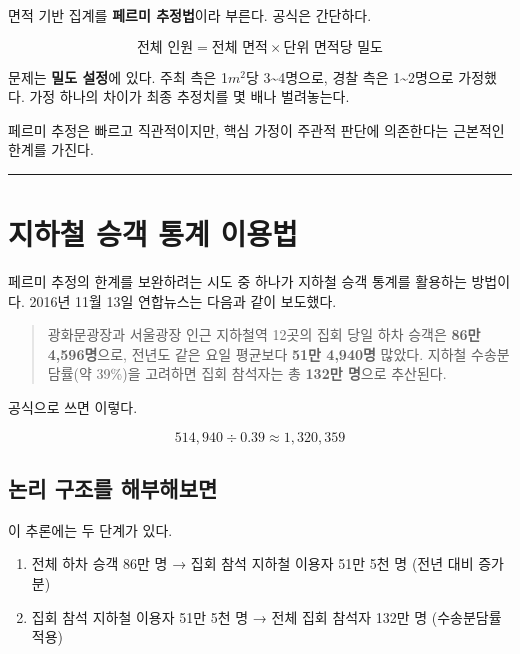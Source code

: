 \documentclass[
  letterpaper,
  DIV=11,
  numbers=noendperiod]{scrreprt}
\providecommand{\tightlist}{%
  \setlength{\itemsep}{0pt}\setlength{\parskip}{0pt}}
\begin{document}
면적 기반 집계를 \textbf{페르미 추정법}이라 부른다. 공식은 간단하다.

\[\text{전체 인원} = \text{전체 면적} \times \text{단위 면적당 밀도}\]

문제는 \textbf{밀도 설정}에 있다. 주최 측은 1\(m^2\)당
3\textasciitilde4명으로, 경찰 측은 1\textasciitilde2명으로 가정했다.
가정 하나의 차이가 최종 추정치를 몇 배나 벌려놓는다.

페르미 추정은 빠르고 직관적이지만, 핵심 가정이 주관적 판단에 의존한다는
근본적인 한계를 가진다.

\begin{center}\rule{0.5\linewidth}{0.5pt}\end{center}

\section{지하철 승객 통계
이용법}\label{uxc9c0uxd558uxcca0-uxc2b9uxac1d-uxd1b5uxacc4-uxc774uxc6a9uxbc95}

페르미 추정의 한계를 보완하려는 시도 중 하나가 지하철 승객 통계를
활용하는 방법이다. 2016년 11월 13일 연합뉴스는 다음과 같이 보도했다.

\begin{quote}
광화문광장과 서울광장 인근 지하철역 12곳의 집회 당일 하차 승객은
\textbf{86만 4,596명}으로, 전년도 같은 요일 평균보다 \textbf{51만
4,940명} 많았다. 지하철 수송분담률(약 39\%)을 고려하면 집회 참석자는 총
\textbf{132만 명}으로 추산된다.
\end{quote}

공식으로 쓰면 이렇다.

\[514{,}940 \div 0.39 \approx 1{,}320{,}359\]

\subsection{논리 구조를
해부해보면}\label{uxb17cuxb9ac-uxad6cuxc870uxb97c-uxd574uxbd80uxd574uxbcf4uxba74}

이 추론에는 두 단계가 있다.

\begin{enumerate}
\def\labelenumi{\arabic{enumi}.}
\tightlist
\item
  전체 하차 승객 86만 명 → 집회 참석 지하철 이용자 51만 5천 명 (전년
  대비 증가분)
\item
  집회 참석 지하철 이용자 51만 5천 명 → 전체 집회 참석자 132만 명
  (수송분담률 적용)
\end{enumerate}
\end{document}

